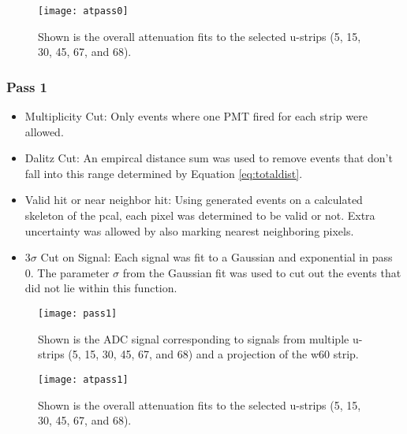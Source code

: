 \begin{figure}[h]
    \centering
    \texttt{[image: atpass0]}
    \caption{Shown is the overall attenuation fits to the selected u-strips 
    (5, 15, 30, 45, 67, and 68).}
    \label{fig:atpass0}
\end{figure}


\clearpage
\FloatBarrier
\subsubsection{Pass 1}
\begin{itemize}
    \item Multiplicity Cut: Only events where one PMT fired for each strip were allowed.
    \item Dalitz Cut: An empircal distance sum was used to remove events that don't fall 
    into this range determined by Equation \ref{eq:totaldist}.
    \item Valid hit or near neighbor hit: Using generated events on a calculated skeleton
     of the pcal, each pixel was determined to be valid or not. Extra uncertainty was 
     allowed by also marking nearest neighboring pixels.
    \item 3$\sigma$ Cut on Signal: Each signal was fit to a Gaussian and exponential in 
    pass 0. The parameter $\sigma$ from the Gaussian fit was used to cut out the events
     that did not lie within this function.
\end{itemize}


\begin{figure}[h]
    \centering
    \texttt{[image: pass1]}
    \caption{Shown is the ADC signal corresponding to signals from multiple u-strips
     (5, 15, 30, 45, 67, and 68) and a projection of the w60 strip.}
    \label{fig:pass1}
\end{figure}

\begin{figure}[h]
    \centering
    \texttt{[image: atpass1]}
    \caption{Shown is the overall attenuation fits to the selected u-strips 
    (5, 15, 30, 45, 67, and 68).}
    \label{fig:atpass1}
\end{figure}



\clearpage
\FloatBarrier

